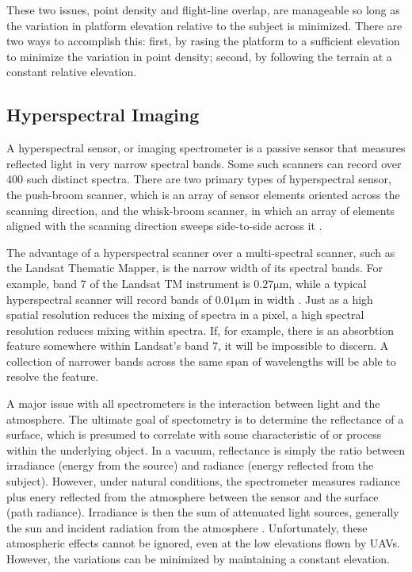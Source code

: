 \documentclass[10pt,a4paper]{report}
\begin{document}
These two issues, point density and flight-line overlap, are manageable so long as the variation in platform elevation relative to the subject is minimized. There are two ways to accomplish this: first, by rasing the platform to a sufficient elevation to minimize the variation in point density; second, by following the terrain at a constant relative elevation.

\subsection{Hyperspectral Imaging}

A hyperspectral sensor, or imaging spectrometer is a passive sensor that measures reflected light in very narrow spectral bands. Some such scanners can record over 400 such distinct spectra. There are two primary types of hyperspectral sensor, the push-broom scanner, which is an array of sensor elements oriented across the scanning direction, and the whisk-broom scanner, in which an array of elements aligned with the scanning direction sweeps side-to-side across it \cite{Lillesand1999}. 

The advantage of a hyperspectral scanner over a multi-spectral scanner, such as the Landsat Thematic Mapper, is the narrow width of its spectral bands. For example, band 7 of the Landsat TM instrument is $0.27\si{\um}$, while a typical hyperspectral scanner will record bands of $0.01\si{\um}$ in width \cite{Lillesand1999}. Just as a high spatial resolution reduces the mixing of spectra in a pixel, a high spectral resolution reduces mixing within spectra. If, for example, there is an absorbtion feature somewhere within Landsat's band 7, it will be impossible to discern. A collection of narrower  bands across the same span of wavelengths will be able to resolve the feature. 

A major issue with all spectrometers is the interaction between light and the atmosphere. The ultimate goal of spectometry is to determine the reflectance of a surface, which is presumed to correlate with some characteristic of or process within the underlying object. In a vacuum, reflectance is simply the ratio between irradiance (energy from the source) and radiance (energy reflected from the subject). However, under natural conditions, the spectrometer measures radiance plus enery reflected from the atmosphere between the sensor and the surface (path radiance). Irradiance is then the sum of attenuated light sources, generally the sun and incident radiation from the atmosphere \cite{Lillesand1999}. Unfortunately, these atmospheric effects cannot be ignored, even at the low elevations flown by UAVs. However, the variations can be minimized by maintaining a constant elevation.
\end{document}
